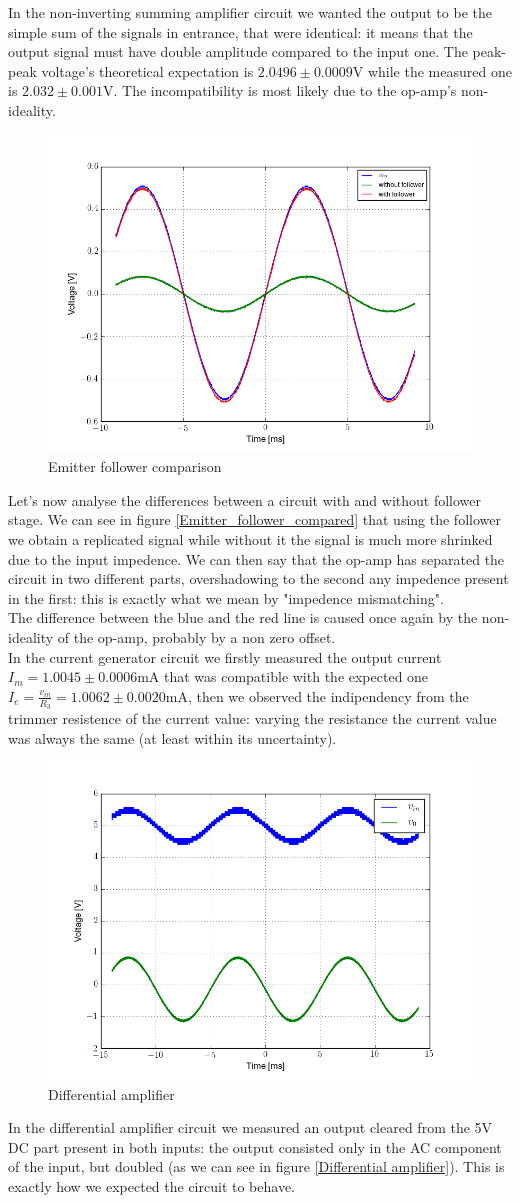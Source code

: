In the non-inverting summing amplifier circuit we wanted the output to be the simple sum of the signals in entrance, that were identical: it means that the output signal must have double amplitude compared to the input one. The peak-peak voltage's theoretical expectation is $2.0496 \pm 0.0009$V while the measured one is $2.032 \pm 0.001 $V. The incompatibility is most likely due to the op-amp's non-ideality.
\begin{figure}[H]
\centering
\includegraphics[width=.7\textwidth]{2/Emitter_follower_compared.png}
\caption{Emitter follower comparison}\label{Emitter_follower_compared}
\end{figure}
Let's now analyse the differences between a circuit with and without follower stage. We can see in figure \eqref{Emitter_follower_compared} that using the follower we obtain a replicated signal while without it the signal is much more shrinked due to the input impedence. We can then say that the op-amp has separated the circuit in two different parts, overshadowing to the second any impedence present in the first: this is exactly what we mean by "impedence mismatching".\\
The difference between the blue and the red line is caused once again by the non-ideality of the op-amp, probably by a non zero offset.\\
\newline
In the current generator circuit we firstly measured the output current $I_m = 1.0045 \pm 0.0006 $mA that was compatible with the expected one $I_e = \frac{v_{in}}{R_3} = 1.0062 \pm 0.0020 $mA, then we observed the indipendency from the trimmer resistence of the current value: varying the resistance the current value was always the same (at least within its uncertainty).
\begin{figure}[H]
\centering
\includegraphics[width=.7\textwidth]{2/Differential_amplifier.png}
\caption{Differential amplifier}\label{Differential amplifier}
\end{figure}
In the differential amplifier circuit we measured an output cleared from the 5V DC part present in both inputs: the output consisted only in the AC component of the input, but doubled (as we can see in figure \eqref{Differential amplifier}). This is exactly how we expected the circuit to behave.
